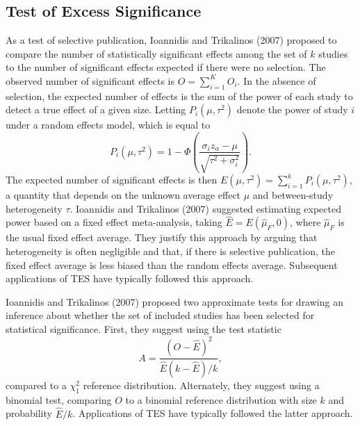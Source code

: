 \documentclass[man,floatsintext]{apa6}
\begin{document}
\hypertarget{test-of-excess-significance}{%
\subsection{Test of Excess Significance}\label{test-of-excess-significance}}

As a test of selective publication, Ioannidis and Trikalinos (2007) proposed to compare the number of statistically significant effects among the set of \(k\) studies to the number of significant effects expected if there were no selection.
The observed number of significant effects is \(O = \sum_{i=1}^K O_i\).
In the absence of selection, the expected number of effects is the sum of the power of each study to detect a true effect of a given size.
Letting \(P_i(\mu,\tau^2)\) denote the power of study \(i\) under a random effects model, which is equal to
\begin{equation} 
P_i(\mu,\tau^2) = 1 - \Phi\left( \frac{\sigma_i z_\alpha - \mu}{\sqrt{\tau^2 + \sigma_i^2}}\right).
\label{eq:power}
\end{equation}
The expected number of significant effects is then \(E(\mu, \tau^2) = \sum_{i=1}^k P_i(\mu, \tau^2)\), a quantity that depends on the unknown average effect \(\mu\) and between-study heterogeneity \(\tau\).
Ioannidis and Trikalinos (2007) suggested estimating expected power based on a fixed effect meta-analysis, taking \(\hat{E} = E(\hat\mu_F, 0)\), where \(\hat\mu_F\) is the usual fixed effect average.
They justify this approach by arguing that heterogeneity is often negligible and that, if there is selective publication, the fixed effect average is less biased than the random effects average.
Subsequent applications of TES have typically followed this approach.

Ioannidis and Trikalinos (2007) proposed two approximate tests for drawing an inference about whether the set of included studies has been selected for statistical significance. First, they suggest using the test statistic
\begin{equation}
A = \frac{(O - \hat{E})^2}{\hat{E}(k - \hat{E}) / k},
\label{eq:chisq-stat}
\end{equation}
compared to a \(\chi^2_1\) reference distribution.
Alternately, they suggest using a binomial test, comparing \(O\) to a binomial reference distribution with size \(k\) and probability \(\hat{E} / k\).
Applications of TES have typically followed the latter approach.
\end{document}
